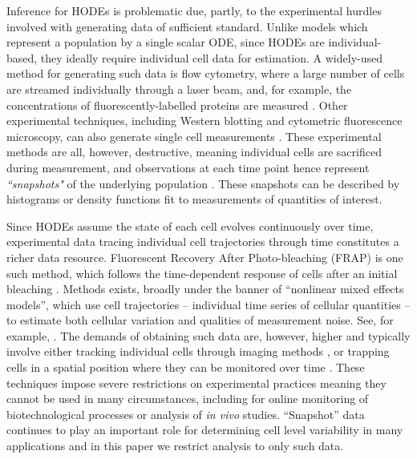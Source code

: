 Inference for HODEs is problematic due, partly, to the experimental hurdles involved with generating data of sufficient standard. Unlike models which represent a population by a single scalar ODE, since HODEs are individual-based, they ideally require individual cell data for estimation. A widely-used method for generating such data is flow cytometry, where a large number of cells are streamed individually through a laser beam, and, for example, the concentrations of fluorescently-labelled proteins are measured \cite{telford2012flow}. Other experimental techniques, including Western blotting and cytometric fluorescence microscopy, can also generate single cell measurements \cite{hughes2014single,hasenauer2011identification}. These experimental methods are all, however, destructive, meaning individual cells are sacrificed during measurement, and observations at each time point hence represent \emph{``snapshots"} of the underlying population \cite{hasenauer2011identification}. These snapshots can be described by histograms \cite{dixit2018maximum} or density functions \cite{waldherr2018estimation} fit to measurements of quantities of interest.

Since HODEs assume the state of each cell evolves continuously over time, experimental data tracing individual cell trajectories through time constitutes a richer data resource. Fluorescent Recovery After Photo-bleaching (FRAP) is one such method, which follows the time-dependent response of cells after an initial bleaching \cite{karlsson2015nonlinear}. Methods exists, broadly under the banner of ``nonlinear mixed effects models'', which use cell trajectories -- individual time series of cellular quantities -- to estimate both cellular variation and qualities of measurement noise. See, for example, \cite{karlsson2015nonlinear,zechner2014scalable,dharmarajan2019simple}. The demands of obtaining such data are, however, higher and typically involve either tracking individual cells through imaging methods \cite{hilsenbeck2016software}, or trapping cells in a spatial position where they can be monitored over time \cite{fritzsch2012single}. These techniques impose severe restrictions on experimental practices meaning they cannot be used in many circumstances, including for online monitoring of biotechnological processes or analysis of \textit{in vivo} studies. ``Snapshot'' data continues to play an important role for determining cell level variability in many applications and in this paper we restrict analysis to only such data.

